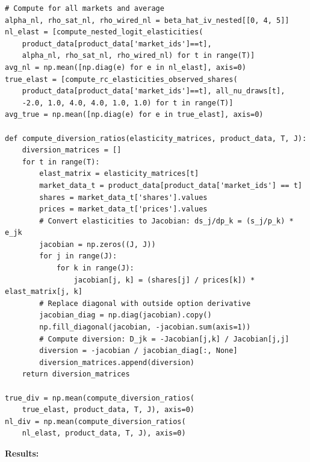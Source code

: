 \documentclass[english,11pt]{article}
\begin{document}
\begin{verbatim}
# Compute for all markets and average
alpha_nl, rho_sat_nl, rho_wired_nl = beta_hat_iv_nested[[0, 4, 5]]
nl_elast = [compute_nested_logit_elasticities(
    product_data[product_data['market_ids']==t], 
    alpha_nl, rho_sat_nl, rho_wired_nl) for t in range(T)]
avg_nl = np.mean([np.diag(e) for e in nl_elast], axis=0)
true_elast = [compute_rc_elasticities_observed_shares(
    product_data[product_data['market_ids']==t], all_nu_draws[t], 
    -2.0, 1.0, 4.0, 4.0, 1.0, 1.0) for t in range(T)]
avg_true = np.mean([np.diag(e) for e in true_elast], axis=0)

def compute_diversion_ratios(elasticity_matrices, product_data, T, J):
    diversion_matrices = []
    for t in range(T):
        elast_matrix = elasticity_matrices[t]
        market_data_t = product_data[product_data['market_ids'] == t]
        shares = market_data_t['shares'].values
        prices = market_data_t['prices'].values
        # Convert elasticities to Jacobian: ds_j/dp_k = (s_j/p_k) * e_jk
        jacobian = np.zeros((J, J))
        for j in range(J):
            for k in range(J):
                jacobian[j, k] = (shares[j] / prices[k]) * elast_matrix[j, k]
        # Replace diagonal with outside option derivative
        jacobian_diag = np.diag(jacobian).copy()
        np.fill_diagonal(jacobian, -jacobian.sum(axis=1))
        # Compute diversion: D_jk = -Jacobian[j,k] / Jacobian[j,j]
        diversion = -jacobian / jacobian_diag[:, None]
        diversion_matrices.append(diversion)
    return diversion_matrices
    
true_div = np.mean(compute_diversion_ratios(
    true_elast, product_data, T, J), axis=0)
nl_div = np.mean(compute_diversion_ratios(
    nl_elast, product_data, T, J), axis=0)
\end{verbatim}

\pagebreak

\noindent \textbf{Results:} 
\end{document}
